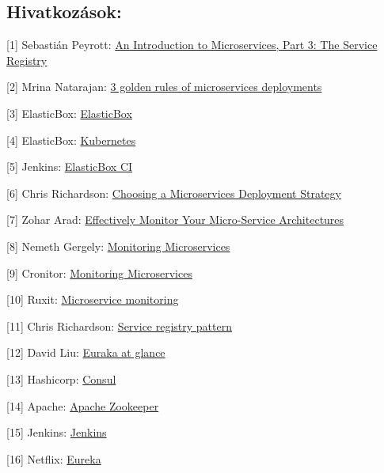 \documentclass[11pt,magyar,a4paper,oneside,]{report}
\begin{document}
\subsection{Hivatkozások:}\label{hivatkozuxe1sok-2}

{[}1{]} Sebastián Peyrott:
\href{https://auth0.com/blog/2015/10/02/an-introduction-to-microservices-part-3-the-service-registry/}{An
Introduction to Microservices, Part 3: The Service Registry}

{[}2{]} Mrina Natarajan:
\href{http://devops.com/2015/05/07/3-golden-rules-microservices-deployments/}{3
golden rules of microservices deployments}

{[}3{]} ElasticBox:
\href{https://elasticbox.com/how-it-works}{ElasticBox}

{[}4{]} ElasticBox: \href{https://elasticbox.com/kubernetes}{Kubernetes}

{[}5{]} Jenkins:
\href{https://wiki.jenkins-ci.org/display/JENKINS/ElasticBox+CI}{ElasticBox
CI}

{[}6{]} Chris Richardson:
\href{https://www.nginx.com/blog/deploying-microservices/}{Choosing a
Microservices Deployment Strategy}

{[}7{]} Zohar Arad:
\href{http://zohararad.github.io/presentations/micro-services-monitoring/}{Effectively
Monitor Your Micro-Service Architectures}

{[}8{]} Nemeth Gergely:
\href{https://www.loggly.com/blog/monitoring-microservices-three-ways-to-overcome-the-biggest-challenges/}{Monitoring
Microservices}

{[}9{]} Cronitor:
\href{https://cronitor.io/help/micro-service-monitoring}{Monitoring
Microservices}

{[}10{]} Ruxit:
\href{https://ruxit.com/microservices/\#microservices_start}{Microservice
monitoring}

{[}11{]} Chris Richardson:
\href{http://microservices.io/patterns/service-registry.html}{Service
registry pattern}

{[}12{]} David Liu:
\href{https://github.com/Netflix/eureka/wiki/Eureka-at-a-glance}{Euraka
at glance}

{[}13{]} Hashicorp: \href{https://www.consul.io/}{Consul}

{[}14{]} Apache: \href{http://zookeeper.apache.org/}{Apache Zookeeper}

{[}15{]} Jenkins: \href{https://jenkins.io/index.html}{Jenkins}

{[}16{]} Netflix: \href{https://github.com/Netflix/eureka/wiki}{Eureka}
\end{document}
